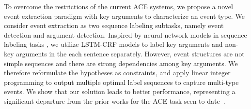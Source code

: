 
To overcome the restrictions of the current ACE systems, we propose a novel event extraction paradigm with key
arguments to characterize an event type. We consider event extraction as two sequence labeling subtasks, namely event
detection and argument detection. Inspired by neural network models in sequence labeling tasks
\cite{huang2015bidirectional,lample2016neural}, we utilize LSTM-CRF models to label key arguments and non-key arguments
in the each sentence separately. However, event structures are not simple sequences and there are strong dependencies
among key arguments. We therefore reformulate the hypotheses as constraints, and apply linear integer programming to
output multiple optimal label sequences to capture multi-type events. We show that our solution leads to better performance,
representing a significant departure from the prior works for the ACE task seen to date~\cite{ahn2006stages,li2013joint,chen2015event,nguyen2016joint}.


